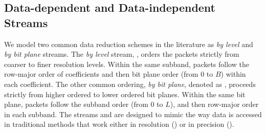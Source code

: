 
\subsection{Data-dependent and Data-independent Streams} \label{sec:static-dynamic-streams}


We model two common data reduction schemes in the literature as \emph{by level} and \emph{by bit
plane} streams. The \emph{by level} stream, \slvl, orders the packets strictly from coarser to finer
resolution levels. Within the same subband, packets follow the row-major order of coefficients and
then bit plane order (from 0 to $B$) within each coefficient. The other common ordering, \emph{by
bit plane}, denoted as \sbit, proceeds strictly from higher ordered to lower ordered bit planes.
Within the same bit plane, packets follow the subband order (from 0 to $L$), and then row-major
order in each subband.
%
The streams \slvl and \sbit are designed to mimic the way data is accessed in traditional methods
that work either in resolution (\slvl) or in precision (\sbit).

